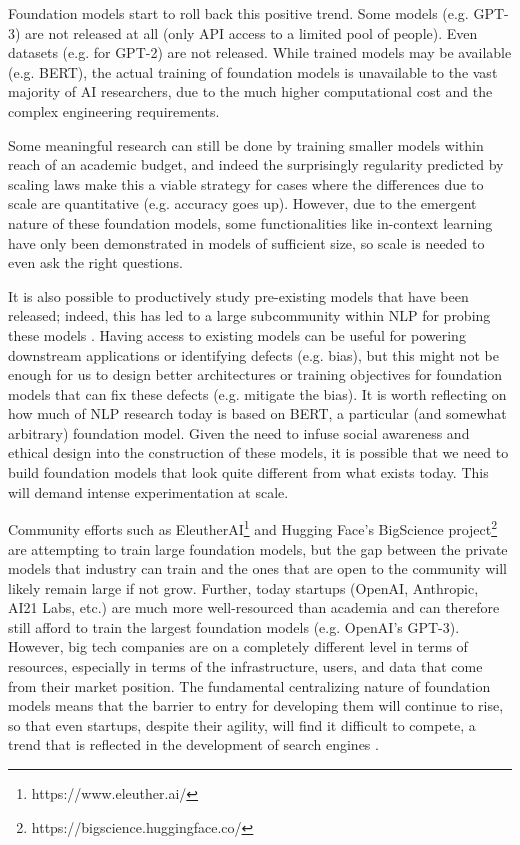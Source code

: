 Foundation models start to roll back this positive trend. Some models (e.g. {}GPT-3) are not released at all (only API access to a limited pool of people). Even datasets (e.g. {}for GPT-2) are not released. While trained models may be available (e.g. {}BERT), the actual training of foundation models is unavailable to the vast majority of AI researchers, due to the much higher computational cost and the complex engineering requirements.

Some meaningful research can still be done by training smaller models within reach of an academic budget, and indeed the surprisingly regularity predicted by scaling laws \citep{kaplan2020} make this a viable strategy for cases where the differences due to scale are quantitative (e.g. accuracy goes up). However, due to the emergent nature of these foundation models, some functionalities like in-context learning have only been demonstrated in models of sufficient size, so scale is needed to even ask the right questions.

It is also possible to productively study pre-existing models that have been released; indeed, this has led to a large subcommunity within NLP for probing these models \citep{rogers2020primer, manning2020emergent}. Having access to existing models can be useful for powering downstream applications or identifying defects (e.g. {}bias), but this might not be enough for us to design better architectures or training objectives for foundation models that can fix these defects (e.g. {}mitigate the bias). It is worth reflecting on how much of NLP research today is based on BERT, a particular (and somewhat arbitrary) foundation model. Given the need to infuse social awareness and ethical design into the construction of these models, it is possible that we need to build foundation models that look quite different from what exists today. This will demand intense experimentation at scale.

Community efforts such as EleutherAI\footnote{https://www.eleuther.ai/} and Hugging Face's BigScience project\footnote{https://bigscience.huggingface.co/}
are attempting to train large foundation models, but the gap between the private models that industry can train and the ones that are open to the community will likely remain large if not grow. Further, today startups (OpenAI, Anthropic, AI21 Labs, etc.) are much more well-resourced than academia and can therefore still afford to train the largest foundation models (e.g. OpenAI's GPT-3). However, big tech companies are on a completely different level in terms of resources, especially in terms of the infrastructure, users, and data that come from their market position. The fundamental centralizing nature of foundation models means that the barrier to entry for developing them will continue to rise, so that even startups, despite their agility, will find it difficult to compete, a trend that is reflected in the development of search engines \citep{radinsky2015data}.

